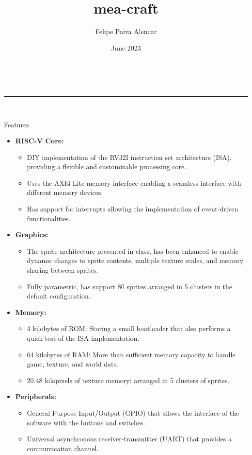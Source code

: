 \documentclass[10pt]{article}
\title{mea-craft}
\author{Felipe Paiva Alencar}
\date{June 2023}
\makeatletter
\renewcommand{\maketitle}{
{\Huge\textbf{\@title}} \\
\noindent\rule{\textwidth}{1pt} \\
\medskip
}
\renewcommand{\section}{%
  \@startsection{section}{1}{0pt}{-3.5ex plus -1ex minus -.2ex}{2.3ex plus .2ex}{\Large\bfseries\sffamily}%
}
\makeatother
\begin{document}
\maketitle

\begin{multicols}{2}

\section{Features}

\begin{itemize}

\item \textbf{RISC-V Core:}
\begin{itemize}
\item DIY implementation of the RV32I instruction set architecture (ISA),
providing a flexible and customizable processing core.
\item Uses the AXI4-Lite memory interface enabling a seamless interface with
different memory devices.
\item Has support for interrupts allowing the implementation of event-driven
functionalities.
\end{itemize}

\item \textbf{Graphics:}
\begin{itemize}
\item The sprite architecture presented in class, has been enhanced to enable
dynamic changes to sprite contents, multiple texture scales, and memory sharing
between sprites.
\item Fully parametric, has support 80 sprites arranged in 5 clusters in the
default configuration.
\end{itemize}

\item \textbf{Memory:} 
\begin{itemize}
\item 4 kilobytes of ROM: Storing a small bootloader that also performs a quick
test of the ISA implementation.
\item 64 kilobytes of RAM: More than sufficient memory capacity to
handle game, texture, and world data.
\item 20.48 kilopixels of texture memory: arranged in 5 clusters of sprites.
\end{itemize}

\item \textbf{Peripherals:}
\begin{itemize}
\item General Purpose Input/Output (GPIO) that allows the interface of the
software with the buttons and switches. 
\item Universal asynchronous receiver-transmitter (UART) that provides a
communication channel.
\end{itemize}


\end{itemize}
\end{multicols}
\end{document}

